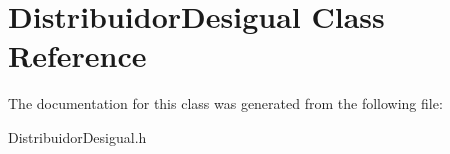 \hypertarget{class_distribuidor_desigual}{\section{Distribuidor\-Desigual Class Reference}
\label{class_distribuidor_desigual}
}


The documentation for this class was generated from the following file\-:\begin{DoxyCompactItemize}
\item 
Distribuidor\-Desigual.\-h\end{DoxyCompactItemize}
